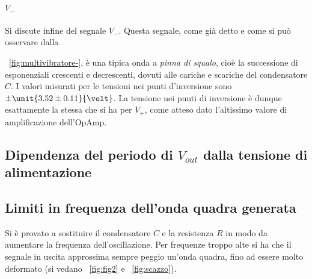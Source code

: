 \documentclass[10pt,a4paper]{article}
\begin{document}
\paragraph{$V_-$} Si discute infine del segnale $V_-$.
Questa segnale, come già detto e come si può osservare dalla \figurename{~\ref{fig:multivibratore-}, è una tipica onda a \emph{pinna di squalo}, cioè la successione di esponenziali crescenti e decrescenti, dovuti alle cariche e scariche del condensatore $C$. I valori misurati per le tensioni nei punti d'inversione sono $\pm \unit{3.52 \pm 0.11}{\volt}$.
La tensione nei punti di inversione è dunque esattamente la stessa che si ha per $V_+$, come atteso dato l'altissimo valore di amplificazione dell'OpAmp.

\subsection{Dipendenza del periodo di $V_{out}$ dalla tensione di alimentazione}

\subsection{Limiti in frequenza dell'onda quadra generata}
Si è provato a sostituire il condensatore $C$ e la resistenza $R$ in modo da aumentare la frequenza dell'oscillazione. Per frequenze troppo alte si ha che il segnale in uscita approssima sempre peggio un'onda quadra, fino ad essere molto deformato (si vedano \figurename{~\ref{fig:fig2}} e \figurename{~\ref{fig:scazzo}}).

}
\end{document}
